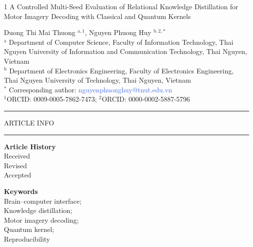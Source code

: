 \documentclass[11pt,a4paper,twoside,asymmetric]{article}
\begin{document}
\begin{flushleft}
{\LARGE{
\begin{spacing}{1}
A Controlled Multi-Seed Evaluation of Relational Knowledge Distillation for Motor Imagery Decoding with Classical and Quantum Kernels
\end{spacing}
}}
\vspace{1em}
Duong Thi Mai Thuong $^{\text{a},1}$, Nguyen Phuong Huy $^{\text{b},2,\ast}$\\
\vspace{.5em}
\footnotesize{$^\text{a}$ Department of Computer Science, Faculty of Information Technology, Thai Nguyen University of Information and Communication Technology, Thai Nguyen, Vietnam\\
$^\text{b}$ Department of Electronics Engineering, Faculty of Electronics Engineering, Thai Nguyen University of Technology, Thai Nguyen, Vietnam\\
$^\ast$ Corresponding author: \textcolor{RoyalBlue}{nguyenphuonghuy@tnut.edu.vn}\\
$^1$ORCID: 0009-0005-7862-7473; $^2$ORCID: 0000-0002-5887-5796}
\end{flushleft}
{\color{RoyalBlue} \rule{\linewidth}{0.4mm}}
\vspace{.5em}
\noindent
\parbox[t][][s]{0.26\textwidth}{ARTICLE INFO
\vspace{.5em}

{\color{RoyalBlue}\rule{\linewidth}{0.4mm}}

\vspace{1em}
\footnotesize{\textbf{Article History}\\
Received \\
Revised \\
Accepted \\
}

\vspace{1em}
\small{\footnotesize{\textbf{Keywords}\\
Brain--computer interface;\\
Knowledge distillation;\\
Motor imagery decoding;\\
Quantum kernel;\\
Reproducibility}
}
\vspace{.5em}
\vspace{\fill}
}
\parbox{0.025\textwidth}{\hspace{0.5em}}
\end{document}

